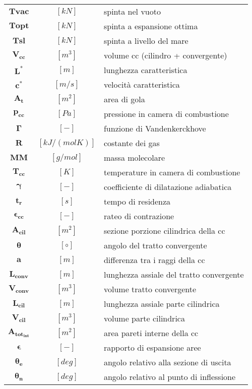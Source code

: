 \begin{multicols}{2}
{\begin{xltabular}{\linewidth}{cc>{\raggedright\arraybackslash}X}
		$\bm{T{vac}}$ & $[kN]$ & spinta nel vuoto \\
		$\bm{T{opt}}$ & $[kN]$ & spinta a espansione ottima \\
		$\bm{T{sl}}$ & $[kN]$ & spinta a livello del mare \\
		$\bm{V_{cc}  }$ & $[m^3]$ & volume cc (cilindro + convergente) \\
		$\bm{L^* }$ & $[m]$ & lunghezza caratteristica \\
		$\bm{c^* }$ & $[m/s]$ & velocità caratteristica \\
		$\bm{A_{t} }$ & $[m^2]$ & area di gola \\
	    $\bm{p_{cc} }$ & $[Pa]$ & pressione in camera di combustione \\
	    $\bm{\Gamma}$ & $[-]$ & funzione di Vandenkerckhove \\
		$\bm{R}$ & $[kJ/(molK)]$ & costante dei gas \\
	    $\bm{MM}$ & $[g/mol]$ & massa molecolare \\
	    $\bm{T_{cc} }$ & $[K]$ & temperature in camera di combustione \\
		$\bm{\gamma}$ & $[-]$ & coefficiente di dilatazione adiabatica \\
	    $\bm{t_{r} }$ & $[s]$ & tempo di residenza \\
	    $\bm{\epsilon_{cc} }$ & $[-]$ & rateo di contrazione             \\
		$\bm{A_{cil} }$ & $[m^2]$ & sezione porzione cilindrica della cc \\
	    $\bm{\theta}$ & $[\circ]$ & angolo del tratto convergente   \\
	    $\bm{a}$ & $[m]$ & differenza tra i raggi della cc \\
		$\bm{L_{conv}}$ & $[m]$ & lunghezza assiale del tratto convergente \\
	    $\bm{V_{conv} }$ & $[m^3]$ & volume tratto convergente  \\
	    $\bm{L_{cil} }$ & $[m]$ & lunghezza assiale parte cilindrica \\
		$\bm{V_{cil} }$ & $[m^3]$ & volume parte cilindrica \\
	    $\bm{A_{tot_{int}}}$ & $[m^2]$ & area pareti interne della cc \\
		$\bm{\epsilon}$ & $[-]$ & rapporto di espansione aree \\
		$\bm{\theta_e}$ & $[deg]$ & angolo relativo alla sezione di uscita \\
		$\bm{\theta_n}$ & $[deg]$ & angolo relativo al punto di inflessione \\

\end{xltabular}}
\end{multicols}
